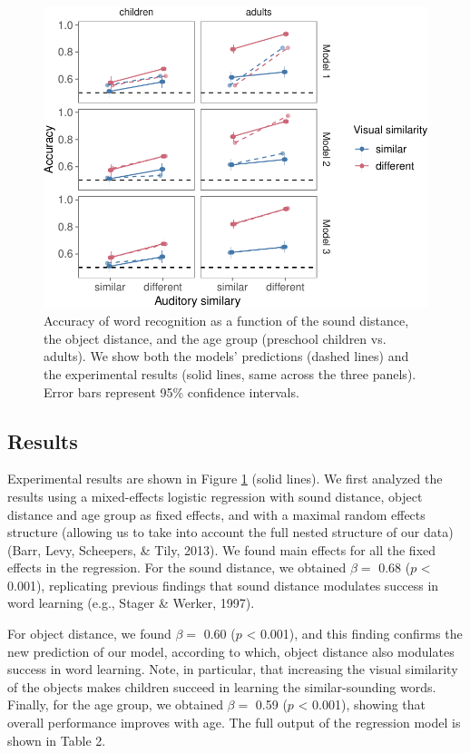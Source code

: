 \documentclass[english,,man,floatsintext]{apa6}
\theoremstyle{definition}
\theoremstyle{definition}
\theoremstyle{definition}
\theoremstyle{remark}
\begin{document}
\begin{figure}[h]

{\centering \includegraphics{ms_full_files/figure-latex/allData-1} 

}

\caption{Accuracy of word recognition as a function of the sound distance, the object distance, and the age group (preschool children vs. adults). We show both the models' predictions (dashed lines) and the experimental results (solid lines, same across the three panels). Error bars represent 95\% confidence intervals.}\label{fig:allData}
\end{figure}

\subsection{Results}\label{results}

Experimental results are shown in Figure \ref{fig:allData} (solid
lines). We first analyzed the results using a mixed-effects logistic
regression with sound distance, object distance and age group as fixed
effects, and with a maximal random effects structure (allowing us to
take into account the full nested structure of our data) (Barr, Levy,
Scheepers, \& Tily, 2013). We found main effects for all the fixed
effects in the regression. For the sound distance, we obtained
\(\beta =\) 0.68 (\(p\) \textless{} 0.001), replicating previous
findings that sound distance modulates success in word learning (e.g.,
Stager \& Werker, 1997).

For object distance, we found \(\beta =\) 0.60 (\(p\) \textless{}
0.001), and this finding confirms the new prediction of our model,
according to which, object distance also modulates success in word
learning. Note, in particular, that increasing the visual similarity of
the objects makes children succeed in learning the similar-sounding
words. Finally, for the age group, we obtained \(\beta =\) 0.59 (\(p\)
\textless{} 0.001), showing that overall performance improves with age.
The full output of the regression model is shown in Table 2.
\end{document}
